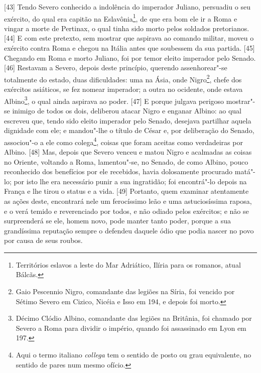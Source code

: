 {[}43{]} Tendo Severo conhecido a indolência do imperador Juliano,
persuadiu o seu exército, do qual era capitão na Eslavônia\footnote{Territórios
  eslavos a leste do Mar Adriático, Ilíria para os romanos, atual
  Bálcãs.}, de que era bom ele ir a Roma e vingar a morte de Pertinax, o
qual tinha sido morto pelos soldados pretorianos. {[}44{]} E com este
pretexto, sem mostrar que aspirava ao comando militar, moveu o exército
contra Roma e chegou na Itália antes que soubessem da sua partida.
{[}45{]} Chegando em Roma e morto Juliano, foi por temor eleito
imperador pelo Senado. {[}46{]} Restavam a Severo, depois deste
princípio, querendo assenhorear"-se totalmente do estado, duas
dificuldades: uma na Ásia, onde Nigro\footnote{Gaio Pescennio Nigro,
  comandante das legiões na Síria, foi vencido por Sétimo Severo em
  Cizico, Nicéia e Isso em 194, e depois foi morto.}, chefe dos
exércitos asiáticos, se fez nomear imperador; a outra no ocidente, onde
estava Albino\footnote{Décimo Clódio Albino, comandante das legiões na
  Britânia, foi chamado por Severo a Roma para dividir o império, quando
  foi assassinado em Lyon em 197.}, o qual ainda aspirava ao poder.
{[}47{]} E porque julgava perigoso mostrar"-se inimigo de todos os dois,
deliberou atacar Nigro e enganar Albino: ao qual escreveu que, tendo
sido eleito imperador pelo Senado, desejava partilhar aquela dignidade
com ele; e mandou"-lhe o título de César e, por deliberação do Senado,
associou"-o a ele como colega\footnote{Aqui o termo italiano
  \emph{collega} tem o sentido de posto ou grau equivalente, no sentido
  de pares num mesmo ofício.}, coisas que foram aceitas como verdadeiras
por Albino. {[}48{]} Mas, depois que Severo venceu e matou Nigro e
acalmadas as coisas no Oriente, voltando a Roma, lamentou"-se, no Senado,
de como Albino, pouco reconhecido dos benefícios por ele recebidos,
havia dolosamente procurado matá"-lo; por isto lhe era necessário punir a
sua ingratidão; foi encontrá"-lo depois na França e lhe tirou o status e
a vida. {[}49{]} Portanto, quem examinar atentamente as ações deste,
encontrará nele um ferocíssimo leão e uma astuciosíssima raposa, e o
verá temido e reverenciado por todos, e não odiado pelos exércitos; e
não se surpreenderá se ele, homem novo, pode manter tanto poder, porque
a sua grandíssima reputação sempre o defendeu daquele ódio que podia
nascer no povo por causa de seus roubos.

